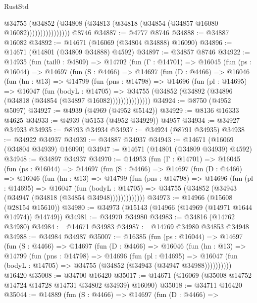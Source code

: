 \begin{lexlean}{RustStd}
\begin{coremodule}
                      @34755
                        (@34852
                          (@34808 (@34813 (@34818 (@34854 (@34857 @16080 @16082))))))))))))))))
    @8746
@34887 := @4777 @8746
@34888 := @34887 @16082
@34892 := @14671 (@16069 (@34804 @34888) @16090)
@34896 := @14671 (@14801 (@34809 @34888) @4592)
@34897 := @34857 @8746
@34922 := @14935
    (fun (tail0 : @4809) =>
    @14702
      (fun (Γ : @14701) =>
      @16045
        (fun (ps : @16044) =>
        @14697
          (fun (S : @4466) =>
          @14697
            (fun (D : @4466) =>
            @16046
              (fun (hn : @13) =>
              @14799
                (fun (pns : @14798) =>
                @14696
                  (fun (pl : @14695) =>
                  @16047
                    (fun (bodyL : @14705) =>
                    @34755 (@34852 (@34892 (@34896 (@34818 (@34854 (@34897 @16082)))))))))))))))
@34924 := @8750 (@4952 @5097)
@34927 := @4939 (@4969 (@4952 @5142))
@34929 := @8136 @16333 @4625
@34933 := @4939 (@5153 (@4952 @34929)) @4957
@34934 := @34927 @34933
@34935 := @8793 @34934
@34937 := @34924 (@8791 @34935)
@34938 := @34922 @34937
@34939 := @34887 @34937
@34943 := @14671 (@16069 (@34804 @34939) @16090)
@34947 := @14671 (@14801 (@34809 @34939) @4592)
@34948 := @34897 @34937
@34970 := @14953
    (fun (Γ : @14701) =>
    @16045
      (fun (ps : @16044) =>
      @14697
        (fun (S : @4466) =>
        @14697
          (fun (D : @4466) =>
          @16046
            (fun (hn : @13) =>
            @14799
              (fun (pns : @14798) =>
              @14696
                (fun (pl : @14695) =>
                @16047
                  (fun (bodyL : @14705) =>
                  @34755 (@34852 (@34943 (@34947 (@34818 (@34854 @34948)))))))))))))
@34973 := @14966 (@15608 (@28154 @15610))
@34980 := @34973 (@15143 (@14966 (@14969 (@14971 @1644 @14974)) @14749))
@34981 := @34970 @34980
@34983 := @34816 (@14762 @34980)
@34984 := @14671 @34983
@34987 := @14769 @34980 @34853 @34948
@34988 := @34984 @34987
@35007 := @16385
    (fun (ps : @16044) =>
    @14697
      (fun (S : @4466) =>
      @14697
        (fun (D : @4466) =>
        @16046
          (fun (hn : @13) =>
          @14799
            (fun (pns : @14798) =>
            @14696
              (fun (pl : @14695) =>
              @16047 (fun (bodyL : @14705) => @34755 (@34852 (@34943 (@34947 @34988))))))))))
    @16420
@35008 := @34700 @16420
@35017 := @14671 (@16069 (@35008 @14752 @14724 @14728 @14731 @34802 @34939) @16090)
@35018 := @34711 @16420
@35044 := @14889
    (fun (S : @4466) =>
    @14697
      (fun (D : @4466) =>

\end{coremodule}
\end{lexlean}
